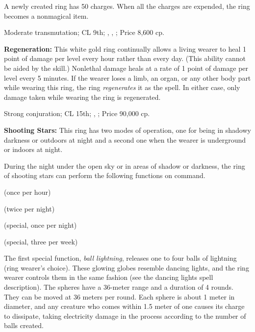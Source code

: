 A newly created ring has 50 charges. When all the charges are expended, the ring becomes a nonmagical item.

Moderate transmutation; CL 9th; , , ; Price 8,600 cp.

\textbf{Regeneration:} This white gold ring continually allows a living wearer to heal 1 point of damage per level every hour rather than every day. (This ability cannot be aided by the  skill.) Nonlethal damage heals at a rate of 1 point of damage per level every 5 minutes. If the wearer loses a limb, an organ, or any other body part while wearing this ring, the ring \emph{regenerates} it as the spell. In either case, only damage taken while wearing the ring is regenerated.

Strong conjuration; CL 15th; , ; Price 90,000 cp.

\textbf{Shooting Stars:} This ring has two modes of operation, one for being in shadowy darkness or outdoors at night and a second one when the wearer is underground or indoors at night.

During the night under the open sky or in areas of shadow or darkness, the ring of shooting stars can perform the following functions on command.

\begin{itemize*}
\item {} (once per hour)
\item {} (twice per night)
\item {} (special, once per night)
\item {} (special, three per week)
\end{itemize*}

The first special function, \emph{ball lightning}, releases one to four balls of lightning (ring wearer's choice). These glowing globes resemble dancing lights, and the ring wearer controls them in the same fashion (see the dancing lights spell description). The spheres have a 36-meter range and a duration of 4 rounds. They can be moved at 36 meters per round. Each sphere is about 1 meter in diameter, and any creature who comes within 1.5 meter of one causes its charge to dissipate, taking electricity damage in the process according to the number of balls created.


